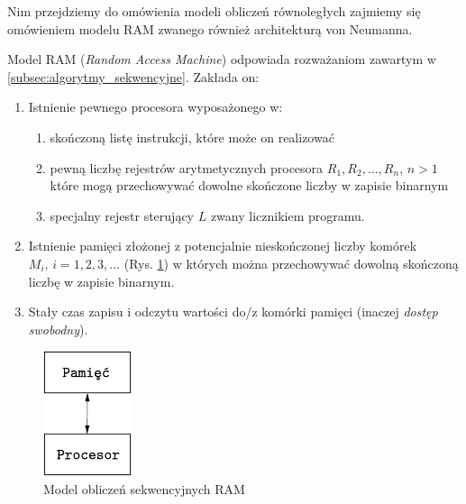 Nim przejdziemy do omówienia modeli obliczeń równoległych zajmiemy się omówieniem modelu RAM zwanego również architekturą von Neumanna.

Model RAM (\emph{Random Access Machine}) odpowiada rozważaniom zawartym w \ref{subsec:algorytmy_sekwencyjne}. Zakłada on:

\begin{enumerate}
\item{Istnienie pewnego procesora wyposażonego w:
\begin{enumerate}
\item skończoną listę instrukcji, które może on realizować
\item pewną liczbę rejestrów arytmetycznych procesora \(R_1, R_2, \dots, R_n\), \(n>1\) które mogą przechowywać dowolne skończone liczby w zapisie binarnym
\item specjalny rejestr sterujący \(L\) zwany licznikiem programu.
\end{enumerate}}
\item Istnienie pamięci złożonej z potencjalnie nieskończonej liczby komórek \(M_i, \, i=1, 2, 3, \dots\) (Rys. \ref{fig:ram}) w których można przechowywać dowolną skończoną liczbę w zapisie binarnym.
\item Stały czas zapisu i odczytu wartości do/z komórki pamięci (inaczej \emph{dostęp swobodny}).

\end{enumerate}

\begin{figure}[h]
\centering
\includegraphics[width=7em]{./images/Rys_RAM.eps}
\caption{Model obliczeń sekwencyjnych RAM}
\label{fig:ram}
\end{figure}

